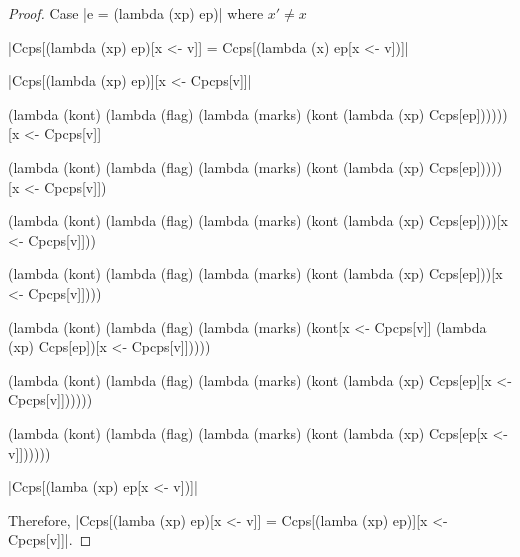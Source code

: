\begin{proof}{Case \scheme|e = (lambda (xp) ep)| where $x'\ne x$}

\noindent
\scheme|Ccps[(lambda (xp) ep)[x <- v]] = Ccps[(lambda (x) ep[x <- v])]|

\noindent
\scheme|Ccps[(lambda (xp) ep)][x <- Cpcps[v]]|

\begin{schemeblock}
\begin{schemedisplay}
(lambda (kont)
  (lambda (flag)
    (lambda (marks)
      (kont (lambda (xp) Ccps[ep])))))[x <- Cpcps[v]]
\end{schemedisplay}
\end{schemeblock}

\begin{schemeblock}
\begin{schemedisplay}
(lambda (kont)
  (lambda (flag)
    (lambda (marks)
      (kont (lambda (xp) Ccps[ep]))))[x <- Cpcps[v]])
\end{schemedisplay}
\end{schemeblock}

\begin{schemeblock}
\begin{schemedisplay}
(lambda (kont)
  (lambda (flag)
    (lambda (marks)
      (kont (lambda (xp) Ccps[ep])))[x <- Cpcps[v]]))
\end{schemedisplay}
\end{schemeblock}

\begin{schemeblock}
\begin{schemedisplay}
(lambda (kont)
  (lambda (flag)
    (lambda (marks)
      (kont (lambda (xp) Ccps[ep]))[x <- Cpcps[v]])))
\end{schemedisplay}
\end{schemeblock}

\begin{schemeblock}
\begin{schemedisplay}
(lambda (kont)
  (lambda (flag)
    (lambda (marks)
      (kont[x <- Cpcps[v]] (lambda (xp) Ccps[ep])[x <- Cpcps[v]]))))
\end{schemedisplay}
\end{schemeblock}

\begin{schemeblock}
\begin{schemedisplay}
(lambda (kont)
  (lambda (flag)
    (lambda (marks)
      (kont (lambda (xp) Ccps[ep][x <- Cpcps[v]])))))
\end{schemedisplay}
\end{schemeblock}

\begin{schemeblock}
\begin{schemedisplay}
(lambda (kont)
  (lambda (flag)
    (lambda (marks)
      (kont (lambda (xp) Ccps[ep[x <- v]])))))
\end{schemedisplay}
\end{schemeblock}

\noindent
\scheme|Ccps[(lamba (xp) ep[x <- v])]|

Therefore, \scheme|Ccps[(lamba (xp) ep)[x <- v]] = Ccps[(lamba (xp) ep)][x <- Cpcps[v]]|.
\end{proof}

